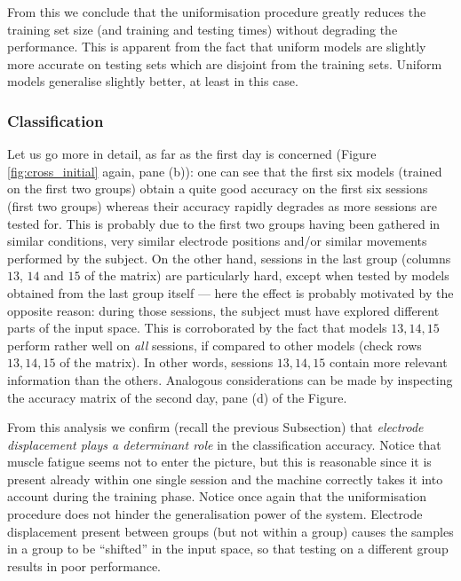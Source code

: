 From this we conclude that the uniformisation procedure greatly
reduces the training set size (and training and testing times) without
degrading the performance. This is apparent from the fact that uniform
models are slightly more accurate on testing sets which are disjoint
from the training sets. Uniform models generalise slightly better, at
least in this case.

\subsubsection{Classification}

Let us go more in detail, as far as the first day is concerned (Figure
\ref{fig:cross_initial} again, pane (b)): one can see that the first
six models (trained on the first two groups) obtain a quite good
accuracy on the first six sessions (first two groups) whereas their
accuracy rapidly degrades as more sessions are tested for. This is
probably due to the first two groups having been gathered in similar
conditions, very similar electrode positions and/or similar movements
performed by the subject. On the other hand, sessions in the last
group (columns $13$, $14$ and $15$ of the matrix) are particularly
hard, except when tested by models obtained from the last group itself
--- here the effect is probably motivated by the opposite reason:
during those sessions, the subject must have explored different parts
of the input space. This is corroborated by the fact that models
$13,14,15$ perform rather well on \emph{all} sessions, if compared to
other models (check rows $13,14,15$ of the matrix). In other words,
sessions $13,14,15$ contain more relevant information than the others.
Analogous considerations can be made by inspecting the accuracy matrix
of the second day, pane (d) of the Figure.

From this analysis we confirm (recall the previous Subsection) that
\emph{electrode displacement plays a determinant role} in the
classification accuracy. Notice that muscle fatigue seems not to enter
the picture, but this is reasonable since it is present already within
one single session and the machine correctly takes it into account
during the training phase. Notice once again that the uniformisation
procedure does not hinder the generalisation power of the
system. Electrode displacement present between groups (but not within
a group) causes the samples in a group to be ``shifted'' in the input
space, so that testing on a different group results in poor
performance.

